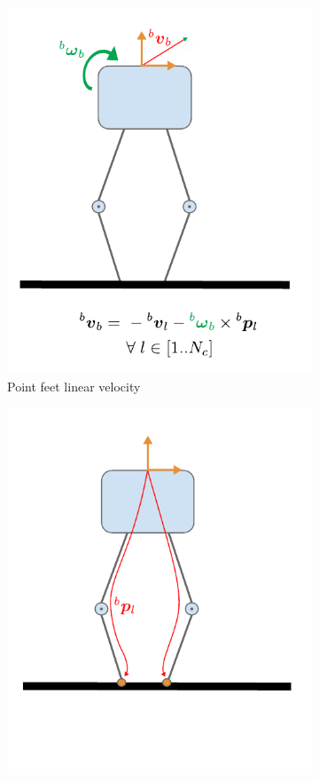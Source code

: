 \begin{figure}
\begin{subfigure}{.33\linewidth}
        \includegraphics[width=\textwidth]{figures/robot_kinematic_types_point_vel.pdf}
        \caption{Point feet linear velocity}
    \end{subfigure}%
       \hfill
    \begin{subfigure}{.33\linewidth}
        \centering
        \includegraphics[width=\textwidth]{figures/robot_kinematic_types_point_direct.pdf}

\end{subfigure}
\end{figure}

